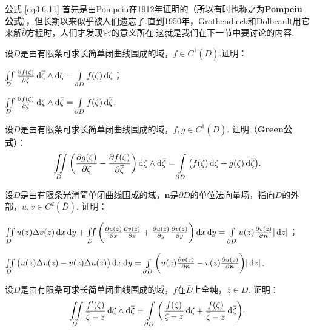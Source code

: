 公式 \eqref{eq3.6.11} 首先是由Pompeiu在1912年证明的（所以有时也称之为\textbf{Pompeiu公式}），但长期以来似乎被人们遗忘了.直到1950年，Grothendieck和Dolbeault用它来解$\bar\partial$方程时，人们才发现它的意义所在.这就是我们在下一节中要讨论的内容.
\begin{xiti}
  \item 设$D$是由有限条可求长简单闭曲线围成的域，$f\in C^1(\bar D)$.证明：
    \begin{enuma}
      \item $\iint\limits_D\pp{f(\zeta)}{\bar\zeta}\dif \bar\zeta\wedge\dif \zeta=\int\limits_{\partial D}f(\zeta)\dif \zeta$；
      \item $\iint\limits_D\pp{f(\zeta)}{\zeta}\dif \zeta\wedge\dif \bar\zeta=\int\limits_{\partial D}f(\zeta)\dif \bar\zeta$.
    \end{enuma}
  \item 设$D$是由有限条可求长简单闭曲线围成的域，$f,g\in C^1(\bar D)$. 证明（\textbf{Green公式}）：
    \[
      \iint\limits_D\bigg(\pp{g(\zeta)}\zeta-\pp{f(\zeta)}{\bar\zeta}\bigg)
      \dif \zeta\wedge\dif \bar\zeta=\int\limits_{\partial D}
      \big(f(\zeta)\dif \zeta+g(\zeta)\dif \bar\zeta\big).
    \]
  \item 设$D$是由有限条光滑简单闭曲线围成的域，$\boldsymbol n$是$\partial D$的单位法向量场，指向$D$的外部，$u,v\in C^2(\bar D)$. 证明：
    \begin{enuma}
      \item $\iint\limits_Du(z)\Delta v(z)\dx\dy+\iint\limits_D\bigg(
        \pp{u(z)}x\pp{v(z)}x+\pp{u(z)}y\pp{v(z)}y\bigg)\dx\dy=\int\limits_{\partial D}
        u(z)\pp{v(z)}{\boldsymbol n}|\dz|$；
      \item $\iint\limits_D\big(u(z)\Delta v(z)-v(z)\Delta u(z)\big)\dx\dy
        =\int\limits_{\partial D}\bigg(u(z)\pp{v(z)}{\boldsymbol n}
        -v(z)\pp{u(z)}{\boldsymbol n}\bigg)|\dz|$.
    \end{enuma}
  \item 设$D$是由有限条可求长简单闭曲线围成的域，$f$在$\bar D$上全纯，$z\in D$. 证明：
    \[
      \iint\limits_D\frac{f'(\zeta)}{\bar\zeta-\bar z}\dif \zeta\wedge\dif \bar\zeta
      = \int\limits_{\partial D}\bigg(\frac{f(\zeta)}{\zeta-z}\dif \zeta+\frac{f(\zeta)}{\bar \zeta-\bar z}\dif \bar\zeta\bigg).
    \]
\end{xiti}

